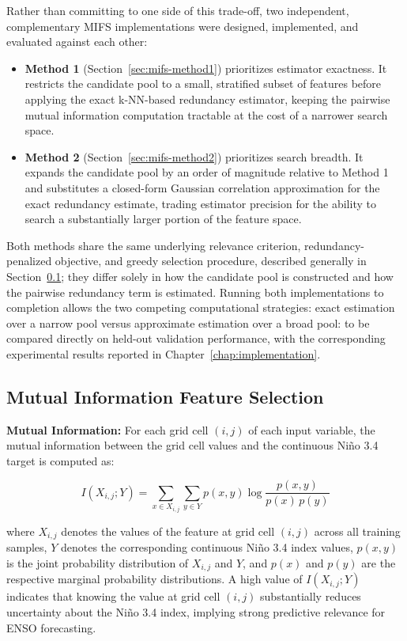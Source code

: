 Rather than committing to one side of this trade-off, two independent, complementary MIFS implementations were designed, implemented, and evaluated against each other:

\begin{itemize}
    \item \textbf{Method 1} (Section~\ref{sec:mifs-method1}) prioritizes estimator exactness. It restricts the candidate pool to a small, stratified subset of features before applying the exact k-NN-based redundancy estimator, keeping the pairwise mutual information computation tractable at the cost of a narrower search space.
    \item \textbf{Method 2} (Section~\ref{sec:mifs-method2}) prioritizes search breadth. It expands the candidate pool by an order of magnitude relative to Method 1 and substitutes a closed-form Gaussian correlation approximation for the exact redundancy estimate, trading estimator precision for the ability to search a substantially larger portion of the feature space.
\end{itemize}

Both methods share the same underlying relevance criterion, redundancy-penalized objective, and greedy selection procedure, described generally in Section~\ref{sec:mifs-general}; they differ solely in how the candidate pool is constructed and how the pairwise redundancy term is estimated. Running both implementations to completion allows the two competing computational strategies: exact estimation over a narrow pool versus approximate estimation over a broad pool: to be compared directly on held-out validation performance, with the corresponding experimental results reported in Chapter~\ref{chap:implementation}.

\subsection{Mutual Information Feature Selection}
\label{sec:mifs-general}

\textbf{Mutual Information:} For each grid cell $(i,j)$ of each input variable, the mutual information between the grid cell values and the continuous Ni\~{n}o 3.4 target is computed as:

\begin{equation}
I(X_{i,j}; Y) = \sum_{x \in X_{i,j}} \sum_{y \in Y} p(x, y) \log \frac{p(x, y)}{p(x)\, p(y)}
\end{equation}

\noindent where $X_{i,j}$ denotes the values of the feature at grid cell $(i,j)$ across all training samples, $Y$ denotes the corresponding continuous Ni\~{n}o 3.4 index values, $p(x,y)$ is the joint probability distribution of $X_{i,j}$ and $Y$, and $p(x)$ and $p(y)$ are the respective marginal probability distributions. A high value of $I(X_{i,j}; Y)$ indicates that knowing the value at grid cell $(i,j)$ substantially reduces uncertainty about the Ni\~{n}o 3.4 index, implying strong predictive relevance for ENSO forecasting.

